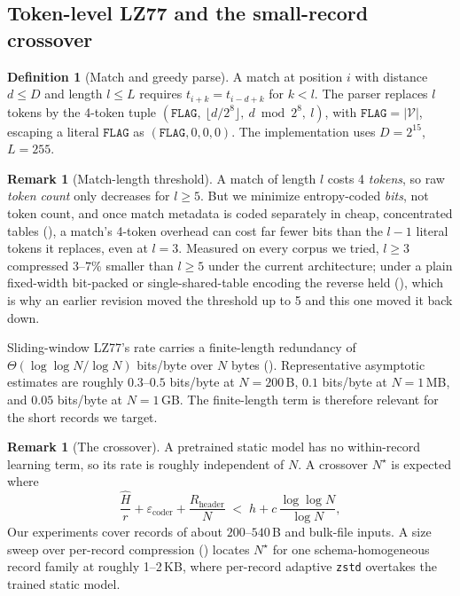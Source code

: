 \documentclass[10pt,twocolumn]{article}
\theoremstyle{plain}
\theoremstyle{definition}
\newtheorem{definition}[theorem]{Definition}
\newtheorem{remark}[theorem]{Remark}
\newcommand{\V}{\mathcal{V}}
\newcommand{\FLAG}{\mathtt{FLAG}}
\begin{document}
\subsection{Token-level LZ77 and the small-record crossover}\label{sec:crossover}

\begin{definition}[Match and greedy parse]
A match at position $i$ with distance $d \le D$ and length $l \le L$ requires
$t_{i+k} = t_{i-d+k}$ for $k < l$. The parser replaces $l$ tokens by the 4-token
tuple $(\FLAG,\ \lfloor d/2^8\rfloor,\ d \bmod 2^8,\ l)$, with
$\FLAG = |\V|$, escaping a literal $\FLAG$ as $(\FLAG,0,0,0)$. The implementation
uses $D = 2^{15}$, $L = 255$.
\end{definition}

\begin{remark}[Match-length threshold]\label{rem:threshold}
A match of length $l$ costs 4 \emph{tokens}, so raw \emph{token count} only decreases
for $l \ge 5$. But we minimize entropy-coded \emph{bits}, not token count, and once
match metadata is coded separately in cheap, concentrated tables
(), a match's 4-token overhead can cost far fewer bits than the
$l{-}1$ literal tokens it replaces, even at $l=3$. Measured on every corpus we tried,
$l\ge3$ compressed $3$--$7\%$ smaller than $l\ge5$ under the current architecture;
under a plain fixed-width bit-packed or single-shared-table encoding the reverse held
(), which is why an earlier revision moved the threshold up to 5 and
this one moved it back down.
\end{remark}

Sliding-window LZ77's rate carries a finite-length redundancy of
$\Theta(\log\log N/\log N)$ bits/byte over $N$ bytes ().
Representative asymptotic estimates are roughly $0.3$--$0.5$ bits/byte at
$N=200$\,B, $0.1$ bits/byte at $N=1$\,MB, and $0.05$ bits/byte at $N=1$\,GB. The
finite-length term is therefore relevant for the short records we target.

\begin{remark}[The crossover]\label{rem:crossover}
A pretrained static model has no within-record learning term, so its rate is roughly
independent of $N$. A crossover $N^\star$ is expected where
\[
\frac{\hat H}{r} + \varepsilon_{\mathrm{coder}} + \frac{R_{\mathrm{header}}}{N}
\;<\; h + c\,\frac{\log\log N}{\log N},
\]
Our experiments cover records of about $200$--$540$\,B and bulk-file inputs. A size
sweep over per-record compression () locates $N^\star$ for one
schema-homogeneous record family at roughly 1--2\,KB, where per-record adaptive
\texttt{zstd} overtakes the trained static model.
\end{remark}
\end{document}
